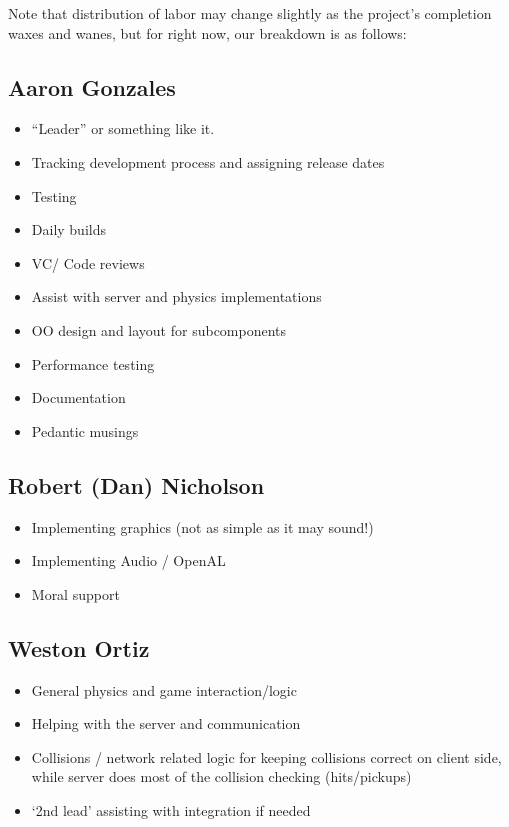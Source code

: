 \documentclass[titlepage]{article}\usepackage[]{graphicx}\usepackage[]{color}
\begin{document}
Note that distribution of labor may change slightly as the project's
completion waxes and wanes, but for right now, our breakdown is as
follows:

\subsection{Aaron Gonzales}\label{aaron-gonzales}

\begin{itemize}
\itemsep1pt\parskip0pt
\item
  ``Leader'' or something like it.
\item
  Tracking development process and assigning release dates
\item
  Testing
\item
  Daily builds
\item
  VC/ Code reviews
\item
  Assist with server and physics implementations
\item
  OO design and layout for subcomponents
\item
  Performance testing
\item
  Documentation
\item
  Pedantic musings
\end{itemize}

\subsection{Robert (Dan) Nicholson}\label{robert-dan-nicholson}

\begin{itemize}
\itemsep1pt\parskip0pt
\item
  Implementing graphics (not as simple as it may sound!)
\item
  Implementing Audio / OpenAL
\item
  Moral support
\end{itemize}

\subsection{Weston Ortiz}\label{weston-ortiz}

\begin{itemize}
\itemsep1pt\parskip0pt
\item
  General physics and game interaction/logic
\item
  Helping with the server and communication
\item
  Collisions / network related logic for keeping collisions correct on
  client side, while server does most of the collision checking
  (hits/pickups)
\item
  `2nd lead' assisting with integration if needed
\end{itemize}
\end{document}
